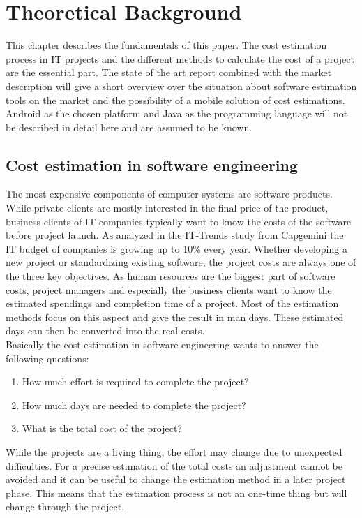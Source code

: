 \chapter{Theoretical Background}

This chapter describes the fundamentals of this paper. The cost estimation process in IT projects and the different methods to calculate the cost of a project are the essential part. The state of the art report combined with the market description will give a short overview over the situation about software estimation tools on the market and the possibility of a mobile solution of cost estimations. Android as the chosen platform and Java as the programming language will not be described in detail here and are assumed to be known.

\section{Cost estimation in software engineering}

The most expensive components of computer systems are software products. While private clients are mostly interested in the final price of the product, business clients of IT companies typically want to know the costs of the software before project launch. As analyzed in the IT-Trends study from Capgemini \cite{capgemini} the IT budget of companies is growing up to 10\% every year. Whether developing a new project or standardizing existing software, the project costs are always one of the three key objectives. As human resources are the biggest part of software costs, project managers and especially the business clients want to know the estimated spendings and completion time of a project. Most of the estimation methods focus on this aspect and give the result in man days. These estimated days can then be converted into the real costs.
\\
Basically the cost estimation in software engineering wants to answer the following questions:
\begin{enumerate}
\item How much effort is required to complete the project?
\item How much days are needed to complete the project?
\item What is the total cost of the project?
\end{enumerate}
While the projects are a living thing, the effort may change due to unexpected difficulties. For a precise estimation of the total costs an adjustment cannot be avoided and it can be useful to change the estimation method in a later project phase. This means that the estimation process is not an one-time thing but will change through the project. 


